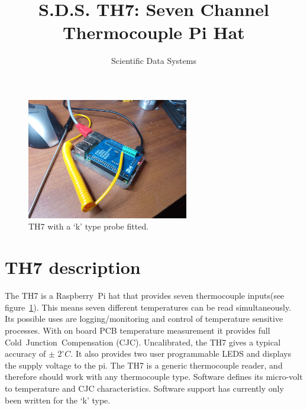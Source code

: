 \documentclass[10pt,foldmark]{leaflet}
\title{S.D.S. TH7: Seven Channel Thermocouple  Pi Hat}
\author{Scientific Data Systems}
\begin{document}
\maketitle

\begin{figure}
 \centering
 \includegraphics[width=200pt]{./TH7_0p4_IMG_20181010_184556D.jpg}
 \caption{TH7 with a `k' type probe fitted.}
 \label{fig:th7}
\end{figure}



\section{TH7 description}
The TH7 is a Raspberry~Pi hat   that
provides seven thermocouple inputs(see figure~\ref{fig:th7}).
%
This means seven different temperatures can be read
simultaneously. 
%
Its possible uses are 
logging/monitoring and control of temperature sensitive processes.
%
With on board PCB temperature measurement
it provides full Cold~Junction~Compensation (CJC).
Uncalibrated, the TH7 gives a typical accuracy of $\pm$ ${2}^{\circ} C$.
%
It also provides two user programmable LEDS and displays the supply voltage to the pi.
\clearpage
The TH7 is a generic thermocouple reader, and therefore should work with any thermocouple type.
%
Software defines its micro-volt to temperature and CJC characteristics.
Software support has currently only been written for the `k' type.

\end{document}
